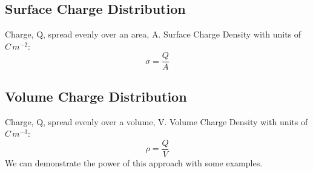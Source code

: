 \documentclass[a4paper, 11pt, normalem]{report}
\begin{document}
\subsection{Surface Charge Distribution}
Charge, Q, spread evenly over an area, A.
Surface Charge Density with units of $C\,m^{-2}$:
\begin{equation}
    \sigma = \frac{Q}{A}
\end{equation}

\subsection{Volume Charge Distribution}
Charge, Q, spread evenly over a volume, V.
Volume Charge Density with units of $C\,m^{-3}$:
\begin{equation}
    \rho = \frac{Q}{V}
\end{equation}
We can demonstrate the power of this approach with some examples.
\end{document}
